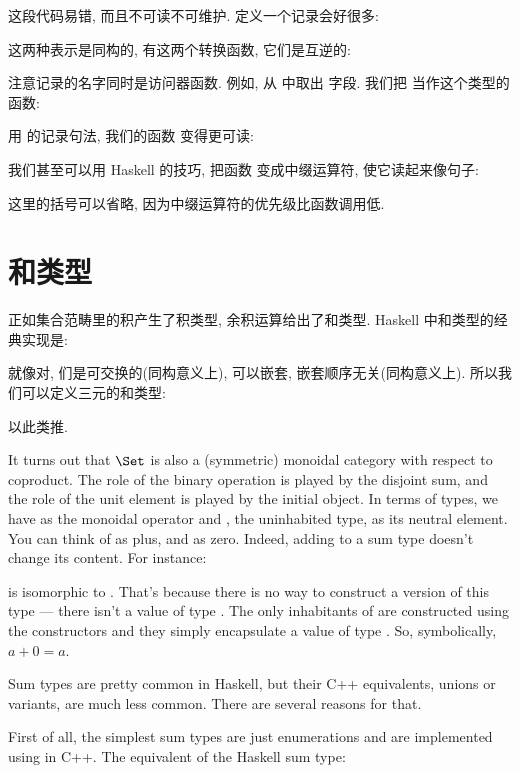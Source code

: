 这段代码易错, 而且不可读不可维护. 定义一个记录会好很多:

这两种表示是同构的, 有这两个转换函数, 它们是互逆的:


注意记录的名字同时是访问器函数. 例如,  从  中取出  字段.
我们把  当作这个类型的函数:

用  的记录句法, 我们的函数  变得更可读:

我们甚至可以用 Haskell 的技巧, 把函数  变成中缀运算符, 使它读起来像句子:

这里的括号可以省略, 因为中缀运算符的优先级比函数调用低.

\section{和类型}

正如集合范畴里的积产生了积类型, 余积运算给出了和类型. Haskell 中和类型的经典实现是:

就像对, 们是可交换的(同构意义上), 可以嵌套, 嵌套顺序无关(同构意义上).
所以我们可以定义三元的和类型:

以此类推.

It turns out that $\Set$ is also a (symmetric) monoidal category
with respect to coproduct. The role of the binary operation is played by
the disjoint sum, and the role of the unit element is played by the
initial object. In terms of types, we have  as the
monoidal operator and , the uninhabited type, as its
neutral element. You can think of  as plus, and
 as zero. Indeed, adding  to a sum type
doesn't change its content. For instance:

is isomorphic to . That's because there is no way to construct
a  version of this type --- there isn't a value of type
. The only inhabitants of  are
constructed using the  constructors and they simply
encapsulate a value of type . So, symbolically, $a + 0 = a$.

Sum types are pretty common in Haskell, but their C++ equivalents,
unions or variants, are much less common. There are several reasons for
that.

First of all, the simplest sum types are just enumerations and are
implemented using  in C++. The equivalent of the Haskell
sum type:

